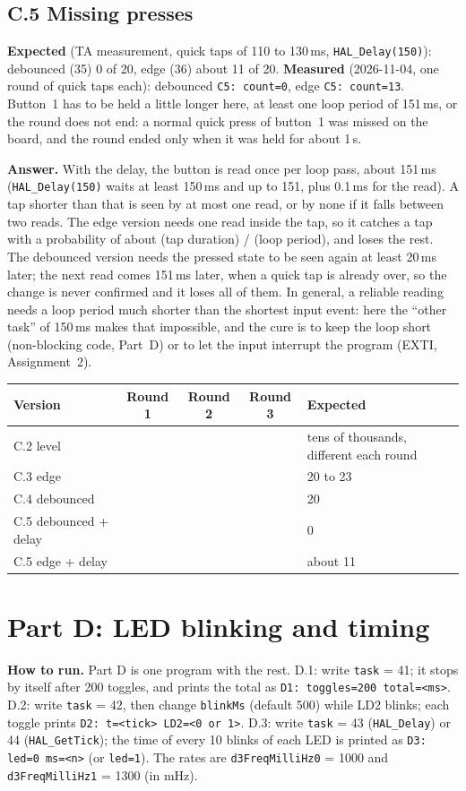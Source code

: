 \documentclass[11pt,a4paper]{article}
\newcommand{\lv}[1]{\texttt{#1}}                 %
\newcommand{\run}[1]{\textbf{How to run.} #1}
\begin{document}
\subsection*{C.5 Missing presses}
\textbf{Expected} (TA measurement, quick taps of 110 to 130\,ms, \texttt{HAL\_Delay(150)}): debounced (35) 0 of 20,
edge (36) about 11 of 20. \textbf{Measured} (2026-11-04, one round of quick taps each): debounced
\texttt{C5: count=0}, edge \texttt{C5: count=13}. Button~1 has to be held a little longer here, at least one loop
period of 151\,ms, or the round does not end: a normal quick press of button~1 was missed on the board, and the round
ended only when it was held for about 1\,s.

\textbf{Answer.} With the delay, the button is read once per loop pass, about 151\,ms (\texttt{HAL\_Delay(150)} waits
at least 150\,ms and up to 151, plus 0.1\,ms for the read). A tap shorter than that is seen by at most one read, or by
none if it falls between two reads. The edge version needs one read inside the tap, so it catches a tap with a
probability of about (tap duration) / (loop period), and loses the rest. The debounced version needs the pressed state
to be seen again at least 20\,ms later; the next read comes 151\,ms later, when a quick tap is already over, so the
change is never confirmed and it loses all of them. In general, a reliable reading needs a loop period much shorter
than the shortest input event: here the ``other task'' of 150\,ms makes that impossible, and the cure is to keep the
loop short (non-blocking code, Part~D) or to let the input interrupt the program (EXTI, Assignment~2).

\smallskip\noindent
\begin{tabularx}{\textwidth}{@{}l c c c L@{}}
\toprule
Version & Round 1 & Round 2 & Round 3 & Expected \\
\midrule
C.2 level & & & & tens of thousands, different each round \\
C.3 edge & & & & 20 to 23 \\
C.4 debounced & & & & 20 \\
C.5 debounced + delay & & & & 0 \\
C.5 edge + delay & & & & about 11 \\
\bottomrule
\end{tabularx}

\section{Part D: LED blinking and timing}
\run{Part D is one program with the rest. D.1: write \lv{task} = 41; it
stops by itself after 200 toggles, and prints the total as \texttt{D1: toggles=200 total=<ms>}. D.2: write \lv{task} = 42, then change
\lv{blinkMs} (default 500) while LD2 blinks; each toggle prints \texttt{D2: t=<tick> LD2=<0 or 1>}. D.3: write \lv{task} = 43 (\texttt{HAL\_Delay}) or 44
(\texttt{HAL\_GetTick}); the time of every 10 blinks of each LED is printed as \texttt{D3: led=0 ms=<n>} (or \texttt{led=1}). The rates are \lv{d3FreqMilliHz0} = 1000 and \lv{d3FreqMilliHz1} = 1300 (in mHz).}
\end{document}
